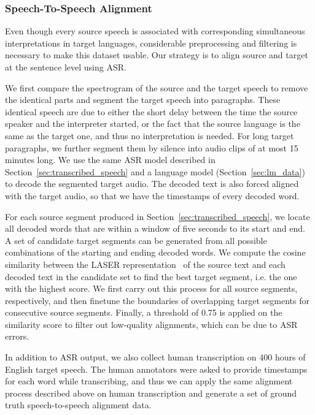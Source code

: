 \subsubsection{Speech-To-Speech Alignment}
Even though every source speech is associated with corresponding simultaneous interpretations in target languages, considerable preprocessing and filtering is necessary to make this dataset usable. Our strategy is to align source and target at the sentence level using ASR.

We first compare the spectrogram of the source and the target speech to remove the identical parts and segment the target speech into paragraphs. These identical speech are due to either the short delay between the time the source speaker and the interpreter started, or the fact that the source language is the same as the target one, and thus no interpretation is needed. For long target paragraphs, we further segment them by silence into audio clips of at most 15 minutes long. We use the same ASR model described in Section~\ref{sec:transcribed_speech} and a language model (Section~\ref{sec:lm_data}) to decode the segmented target audio. The decoded text is also forced aligned with the target audio, so that we have the timestamps of every decoded word. 

For each source segment produced in Section~\ref{sec:transcribed_speech}, we locate all decoded words that are within a window of five seconds to its start and end. A set of candidate target segments can be generated from all possible combinations of the starting and ending decoded words. We compute the cosine similarity between the LASER representation~\citep{artetxe2019massively} of the source text and each decoded text in the candidate set to find the best target segment, i.e. the one with the highest score. We first carry out this process for all source segments, respectively, and then finetune the boundaries of overlapping target segments for consecutive source segments. Finally, a threshold of 0.75 is applied on the similarity score to filter out low-quality alignments, which can be due to ASR errors.

In addition to ASR output, we also collect human transcription on 400 hours of English target speech. The human annotators were asked to provide timestamps for each word while transcribing, and thus we can apply the same alignment process described above on human transcription and generate a set of ground truth speech-to-speech alignment data.

